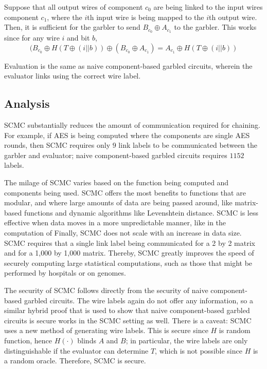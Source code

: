 Suppose that all output wires of component $c_0$ are being linked to the input wires component $c_1$, where the $i$th input wire is being mapped to the $i$th output wire. 
Then, it is sufficient for the garbler to send $B_{c_0} \oplus A_{c_1}$ to the garbler. 
This works since for any wire $i$ and bit $b$,
\begin{equation}
(B_{c_0} \oplus H(T \oplus (i || b)) \oplus (B_{c_0} \oplus A_{c_1}) = A_{c_1} \oplus H(T \oplus (i || b))
\end{equation}

Evaluation is the same as naive component-based garbled circuits, wherein the evaluator links using the correct wire label.

\subsection{Analysis}
SCMC substantially reduces the amount of communication required for chaining. 
For example, if AES is being computed where the components are single AES rounds, then SCMC requires only $9$ link labels to be communicated between the garbler and evaluator; naive component-based garbled circuits requires $1152$ labels. 

The milage of SCMC varies based on the function being computed and components being used. 
SCMC offers the most benefits to functions that are modular, and where large amounts of data are being passed around, like matrix-based functions and dynamic algorithms like Levenshtein distance. 
SCMC is less effective when data moves in a more unpredictable manner, like in the computation of 
Finally, SCMC does not scale with an increase in data size. 
SCMC requires that a single link label being communicated for a 2 by 2 matrix and for a 1,000 by 1,000 matrix. 
Thereby, SCMC greatly improves the speed of securely computing large statistical computations, such as those that might be performed by hospitals or on genomes. 

The security of SCMC follows directly from the security of naive component-based garbled circuits. 
The wire labels again do not offer any information, so a similar hybrid proof that is used to show that naive component-based garbled circuits is secure works in the SCMC setting as well. 
There is a caveat: SCMC uses a new method of generating wire labels. 
This is secure since $H$ is random function, hence $H(\cdot)$ blinds $A$ and $B$; in particular, the wire labels are only distinguishable if the evaluator can determine $T$, which is not possible since $H$ is a random oracle.
Therefore, SCMC is secure. 
































